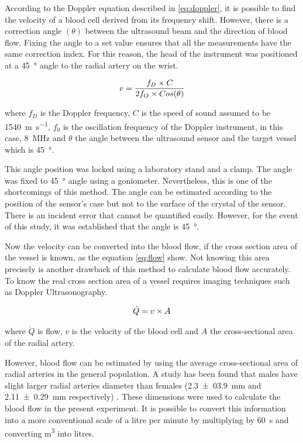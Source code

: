 According to the Doppler equation described in \ref{eq:doppler}, it is possible to find the velocity of a blood cell derived from its frequency shift. However, there is a correction angle $(\theta)$ between the ultrasound beam and the direction of blood flow. Fixing the angle to a set value ensures that all the measurements have the same correction index.  For this reason, the head of the instrument was positioned at a \SI{45}{\degree} angle to the radial artery on the wrist.

\begin{align}
	\label{eq:doppler}
	v = \frac{f_D \times C}{2 f_O \times Cos(\theta)} \tagaddtext{[\si{\meter\per\second}]}
\end{align}

where $f_D$ is the Doppler frequency, $C$ is the speed of sound assumed to be \SI{1540}{\meter\per\second}, $f_0$ is the oscillation frequency of the Doppler instrument, in this case, \SI{8}{\mega\hertz} and $\theta$ the angle between the ultrasound sensor and the target vessel which is \SI{45}{\degree}.

This angle position was locked using a laboratory stand and a clamp. The angle was fixed to \SI{45}{\degree} angle using a goniometer. Nevertheless, this is one of the shortcomings of this method. The angle can be estimated according to the position of the sensor's case but not to the surface of the crystal of the sensor. There is an incident error that cannot be quantified easily. However, for the event of this study, it was established that the angle is \SI{45}{\degree}.

Now the velocity can be converted into the blood flow, if the cross section area of the vessel is known, as the equation \ref{eq:flow} show. Not knowing this area precisely is another drawback of this method to calculate blood flow accurately. To know the real cross section area of a vessel requires imaging techniques such as Doppler Ultrasonography. 

\begin{align}
	\label{eq:flow}
	\dot{Q} = v \times A \tagaddtext{[\si{\cubic\meter\per\second}]}
\end{align}

where $\dot{Q}$ is flow, $v$ is the velocity of the blood cell and $A$ the cross-sectional area of the radial artery.

However, blood flow can be estimated by using the average cross-sectional area of radial arteries in the general population. A study has been found that males have slight larger radial arteries diameter than females (\SI{2.3(039)}{\mm} and \SI{2.11(029)}{\mm} respectively) \cite{ashraf2010size}. These dimensions were used to calculate the blood flow in the present experiment. It is possible to convert this information into a more conventional scale of a litre per minute by multiplying by \SI{60}{\second} and converting \si{\cubic\meter} into litres. 

